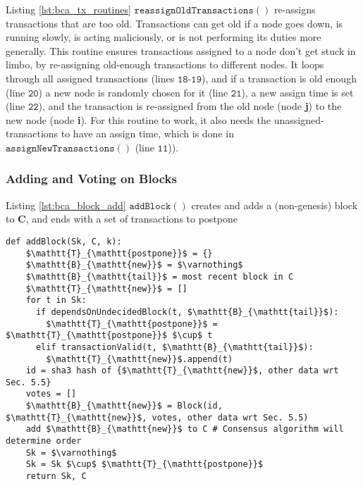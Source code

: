 Listing \ref{lst:bca_tx_routines} $\mathtt{reassignOldTransactions()}$ re-assigns transactions that are too old.
Transactions can get old if a node goes down, is running slowly, is acting maliciously, or is not performing its duties more generally.
This routine ensures transactions assigned to a node don't get stuck in limbo, by re-assigning old-enough transactions to different nodes.
It loops through all assigned transactions (lines $\mathtt{18}$-$\mathtt{19}$), and if a transaction is old enough (line $\mathtt{20}$) a new node is randomly chosen for it (line $\mathtt{21}$), a new assign time is set (line $\mathtt{22}$), and the transaction is re-assigned from the old node (node \textbf{j}) to the new node (node \textbf{i}).
For this routine to work, it also needs the unassigned-transactions to have an assign time, which is done in $\mathtt{assignNewTransactions()}$ (line $\mathtt{11}$)).


\subsubsection{Adding and Voting on Blocks}

\medskip
Listing \ref{lst:bca_block_add} $\mathtt{addBlock()}$ creates and adds a (non-genesis) block to $\mathbf{C}$, and ends with a set of transactions to postpone

\begin{minipage}{\linewidth}
  \begin{lstlisting}[caption={Routine for adding normal blocks.}, label={lst:bca_block_add}, style=python, mathescape=true]
  def addBlock(Sk, C, k):
    $\mathtt{T}_{\mathtt{postpone}}$ = {}
    $\mathtt{B}_{\mathtt{new}}$ = $\varnothing$
    $\mathtt{B}_{\mathtt{tail}}$ = most recent block in C
    $\mathtt{T}_{\mathtt{new}}$ = []
    for t in Sk:
      if dependsOnUndecidedBlock(t, $\mathtt{B}_{\mathtt{tail}}$):
        $\mathtt{T}_{\mathtt{postpone}}$ = $\mathtt{T}_{\mathtt{postpone}}$ $\cup$ t
      elif transactionValid(t, $\mathtt{B}_{\mathtt{tail}}$):
        $\mathtt{T}_{\mathtt{new}}$.append(t)
    id = sha3 hash of {$\mathtt{T}_{\mathtt{new}}$, other data wrt Sec. 5.5}
    votes = []
    $\mathtt{B}_{\mathtt{new}}$ = Block(id, $\mathtt{T}_{\mathtt{new}}$, votes, other data wrt Sec. 5.5)
    add $\mathtt{B}_{\mathtt{new}}$ to C # Consensus algorithm will determine order
    Sk = $\varnothing$
    Sk = Sk $\cup$ $\mathtt{T}_{\mathtt{postpone}}$
    return Sk, C
  \end{lstlisting}
\end{minipage}

